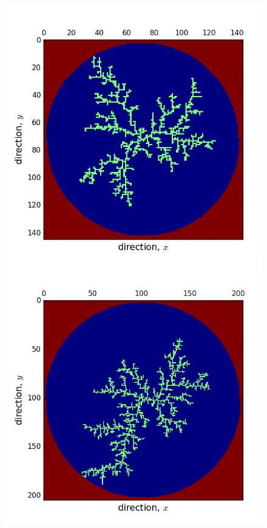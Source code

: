 \documentclass[12pt]{article}
\begin{document}
\begin{figure}[!htb]
  \caption{}\label{fig:dla4}
\endminipage\hfill
{}
  \includegraphics[width=\linewidth]{oneDLAcluster72run1.png}
  \caption{}\label{fig:dla5}
\endminipage\hfill
{}
  \includegraphics[width=\linewidth]{oneDLAcluster102radius.png}
  \caption{}\label{fig:dla6}
\endminipage\hfill
\end{figure}
\end{document}
